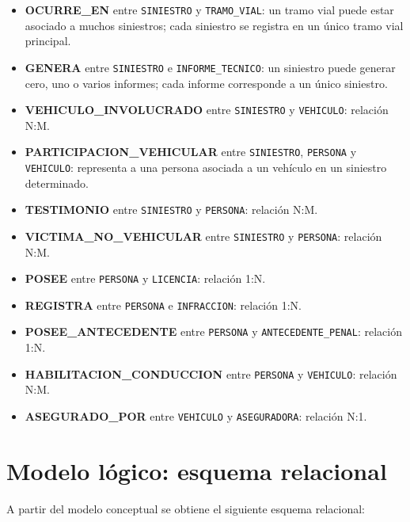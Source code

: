 \documentclass[12pt,a4paper]{article}
\begin{document}
\begin{itemize}[leftmargin=*]
    \item \textbf{OCURRE\_EN} entre \texttt{SINIESTRO} y \texttt{TRAMO\_VIAL}: un tramo vial puede estar asociado a muchos siniestros; cada siniestro se registra en un único tramo vial principal.
    \item \textbf{GENERA} entre \texttt{SINIESTRO} e \texttt{INFORME\_TECNICO}: un siniestro puede generar cero, uno o varios informes; cada informe corresponde a un único siniestro.
    \item \textbf{VEHICULO\_INVOLUCRADO} entre \texttt{SINIESTRO} y \texttt{VEHICULO}: relación N:M.
    \item \textbf{PARTICIPACION\_VEHICULAR} entre \texttt{SINIESTRO}, \texttt{PERSONA} y \texttt{VEHICULO}: representa a una persona asociada a un vehículo en un siniestro determinado.
    \item \textbf{TESTIMONIO} entre \texttt{SINIESTRO} y \texttt{PERSONA}: relación N:M.
    \item \textbf{VICTIMA\_NO\_VEHICULAR} entre \texttt{SINIESTRO} y \texttt{PERSONA}: relación N:M.
    \item \textbf{POSEE} entre \texttt{PERSONA} y \texttt{LICENCIA}: relación 1:N.
    \item \textbf{REGISTRA} entre \texttt{PERSONA} e \texttt{INFRACCION}: relación 1:N.
    \item \textbf{POSEE\_ANTECEDENTE} entre \texttt{PERSONA} y \texttt{ANTECEDENTE\_PENAL}: relación 1:N.
    \item \textbf{HABILITACION\_CONDUCCION} entre \texttt{PERSONA} y \texttt{VEHICULO}: relación N:M.
    \item \textbf{ASEGURADO\_POR} entre \texttt{VEHICULO} y \texttt{ASEGURADORA}: relación N:1.
\end{itemize}

\section{Modelo lógico: esquema relacional}

A partir del modelo conceptual se obtiene el siguiente esquema relacional:
\end{document}
